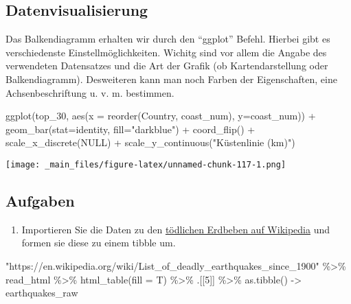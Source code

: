 \documentclass[
  ngerman,
]{article}
\newenvironment{Shaded}{\begin{snugshade}}{\end{snugshade}}
\newcommand{\AttributeTok}[1]{\textcolor[rgb]{0.77,0.63,0.00}{#1}}
\newcommand{\ConstantTok}[1]{\textcolor[rgb]{0.00,0.00,0.00}{#1}}
\newcommand{\DecValTok}[1]{\textcolor[rgb]{0.00,0.00,0.81}{#1}}
\newcommand{\FunctionTok}[1]{\textcolor[rgb]{0.00,0.00,0.00}{#1}}
\newcommand{\NormalTok}[1]{#1}
\newcommand{\OtherTok}[1]{\textcolor[rgb]{0.56,0.35,0.01}{#1}}
\newcommand{\SpecialCharTok}[1]{\textcolor[rgb]{0.00,0.00,0.00}{#1}}
\newcommand{\StringTok}[1]{\textcolor[rgb]{0.31,0.60,0.02}{#1}}
\providecommand{\tightlist}{%
  \setlength{\itemsep}{0pt}\setlength{\parskip}{0pt}}
\begin{document}
\hypertarget{datenvisualisierung}{%
\subsection{Datenvisualisierung}\label{datenvisualisierung}}

Das Balkendiagramm erhalten wir durch den ``ggplot'' Befehl. Hierbei gibt es verschiedenste Einstellmöglichkeiten. Wichitg sind vor allem die Angabe des verwendeten Datensatzes und die Art der Grafik (ob Kartendarstellung oder Balkendiagramm). Desweiteren kann man noch Farben der Eigenschaften, eine Achsenbeschriftung u. v. m. bestimmen.

\begin{Shaded}
\begin{Highlighting}[]
\FunctionTok{ggplot}\NormalTok{(top\_30, }\FunctionTok{aes}\NormalTok{(}\AttributeTok{x =} \FunctionTok{reorder}\NormalTok{(Country, coast\_num), }\AttributeTok{y=}\NormalTok{coast\_num)) }\SpecialCharTok{+}
  \FunctionTok{geom\_bar}\NormalTok{(}\AttributeTok{stat=}\StringTok{\textquotesingle{}identity\textquotesingle{}}\NormalTok{, }\AttributeTok{fill=}\StringTok{"darkblue"}\NormalTok{) }\SpecialCharTok{+}
  \FunctionTok{coord\_flip}\NormalTok{() }\SpecialCharTok{+}
  \FunctionTok{scale\_x\_discrete}\NormalTok{(}\ConstantTok{NULL}\NormalTok{) }\SpecialCharTok{+}
  \FunctionTok{scale\_y\_continuous}\NormalTok{(}\StringTok{"Küstenlinie (km)"}\NormalTok{)}
\end{Highlighting}
\end{Shaded}

\texttt{[image: \_main\_files/figure-latex/unnamed-chunk-117-1.png]}

\hypertarget{aufgaben-5}{%
\subsection{Aufgaben}\label{aufgaben-5}}

\begin{enumerate}
\def\labelenumi{\arabic{enumi}.}
\tightlist
\item
  Importieren Sie die Daten zu den \href{https://en.wikipedia.org/wiki/List_of_deadly_earthquakes_since_1900}{tödlichen Erdbeben auf Wikipedia}
  und formen sie diese zu einem tibble um.
\end{enumerate}

\begin{Shaded}
\begin{Highlighting}[]
\StringTok{"https://en.wikipedia.org/wiki/List\_of\_deadly\_earthquakes\_since\_1900"} \SpecialCharTok{\%\textgreater{}\%}
\NormalTok{  read\_html }\SpecialCharTok{\%\textgreater{}\%}
  \FunctionTok{html\_table}\NormalTok{(}\AttributeTok{fill =}\NormalTok{ T) }\SpecialCharTok{\%\textgreater{}\%}
\NormalTok{  .[[}\DecValTok{5}\NormalTok{]] }\SpecialCharTok{\%\textgreater{}\%}
  \FunctionTok{as.tibble}\NormalTok{() }\OtherTok{{-}\textgreater{}}\NormalTok{ earthquakes\_raw}
\end{Highlighting}
\end{Shaded}
\end{document}
